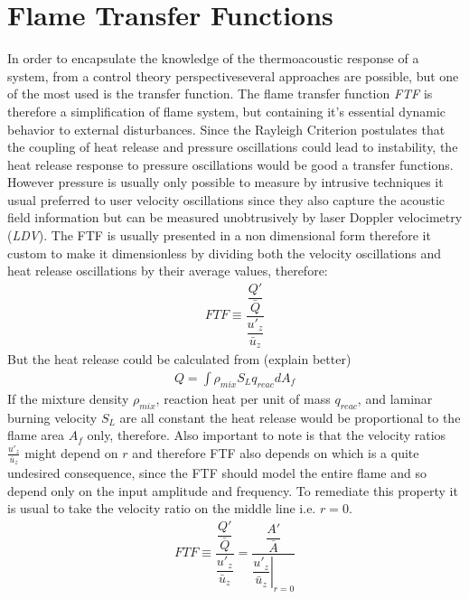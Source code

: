 \section{Flame Transfer Functions}
In order to encapsulate the knowledge of the thermoacoustic response of a system, from a control theory perspectiveseveral approaches are possible, but one of the most used is the transfer function. The flame transfer function \emph{FTF} is therefore a simplification of flame system, but containing it's essential dynamic behavior to external disturbances. Since the Rayleigh Criterion postulates that the coupling of heat release and pressure oscillations could lead to instability, the heat release response to pressure oscillations would be good a transfer functions. However pressure is usually only possible to measure by intrusive techniques it usual preferred to user velocity oscillations since they also capture the acoustic field information but can be measured unobtrusively by laser Doppler velocimetry (\emph{LDV}). The FTF is usually presented in a non dimensional form therefore it custom to make it dimensionless by dividing both the velocity oscillations and heat release oscillations by their average values, therefore:
\begin{align*}
FTF\equiv \dfrac{\dfrac{Q'}{\bar{Q}}}{\dfrac{u'_z}{\bar{u}_z}}
\end{align*}
But the heat release could be calculated from (explain better)
\begin{align*}
Q= \int \rho_{mix} S_L q_{reac} dA_f
\end{align*}
If the mixture density $\rho_{mix}$, reaction heat per unit of mass $q_{reac}$, and laminar burning velocity $S_L$ are all constant the heat release would be proportional to the flame area $A_f$ only, therefore. Also important to note is that the velocity ratios $\tfrac{u'_z}{\bar{u}_z}$ might depend on $r$ and therefore FTF also depends on which is a quite undesired consequence, since the FTF should model the entire flame and so depend only on the input amplitude and frequency. To remediate this property it is usual to take the velocity ratio on the middle line i.e. $r=0$.  
\begin{align*}
FTF\equiv \dfrac{\dfrac{Q'}{\bar{Q}}}{\dfrac{u'_z}{\bar{u}_z}}=\dfrac{\dfrac{A'}{\bar{A}}}{\left. \dfrac{u'_z}{\bar{u}_z}\right|_{r=0}}
\end{align*}


